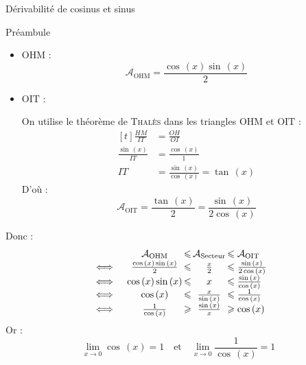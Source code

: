 \documentclass{coursbook}
\begin{document}
\begin{Gpartie}{Dérivabilité de cosinus et sinus}
\begin{Spartie}{Préambule}
\begin{itemize}
                \item $\mathrm{OHM}$ : \[\mathcal{A}_\mathrm{OHM}=\frac{\cos\,(x)\sin\,(x)}{2}\]

                \item $\mathrm{OIT}$ :
                
                On utilise le théorème de \textsc{Thalès} dans les triangles $\mathrm{OHM}$ et $\mathrm{OIT}$ : 
                \[\begin{aligned}[t]
                    \frac{HM}{IT} &= \frac{OH}{OI} \\[1.5ex]
                    \frac{\sin\,(x)}{IT} &=\frac{\cos\,(x)}{1} \\[1.5ex]
                    IT &= \frac{\sin\,(x)}{\cos\,(x)}=\tan\,(x)
                \end{aligned}\]
                D'où :  \[\mathcal{A}_\mathrm{OIT}=\frac{\tan\,(x)}{2}=\frac{\sin\,(x)}{2\cos\,(x)}\]
            \end{itemize}
        
            \renewcommand*{\arraystretch}{2} %

            Donc :~
            \[\begin{array}{ r@{\,} c@{\,} c@{\,} c@{\,} l@{\,} }
                    &\quad\mathcal{A}_\mathrm{OHM}  & \leq & \mathcal{A}_\text{Secteur} & \leq\mathcal{A}_\mathrm{OIT} \\
                \iff&\quad\frac{\cos\,(x)\sin\,(x)}{2}  & \leq & \frac{x}{2}                & \leq\frac{\sin\,(x)}{2\cos\,(x)} \\
                \iff&\quad\cos\,(x)\sin\,(x)            & \leq & x                          & \leq\frac{\sin\,(x)}{\cos\,(x)} \\
                \iff&\quad\cos\,(x)                   & \leq & \frac{x}{\sin\,(x)}          & \leq\frac{1}{\cos\,(x)} \\
                \iff&\quad\frac{1}{\cos\,(x)}         & \geq & \frac{\sin\,(x)}{x}          & \geq\cos\,(x) 
            \end{array}\]
            Or : \[\lim\limits_{x\to0}\cos\,(x)=1\quad\text{et}\quad\lim\limits_{x\to0}\frac{1}{\cos\,(x)}=1\]


\end{Spartie}
\end{Gpartie}
\end{document}
